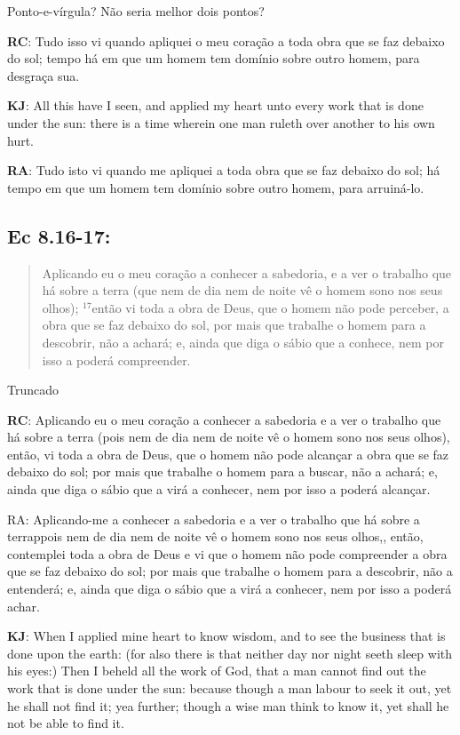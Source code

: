 Ponto-e-vírgula? Não seria melhor dois pontos?

\textbf{RC}: Tudo isso vi quando apliquei o meu coração a toda obra que se faz debaixo do sol; tempo há em que um homem tem domínio sobre outro homem, para desgraça sua.

\textbf{KJ}: All this have I seen, and applied my heart unto every work that is done under the sun: there is a time wherein one man ruleth over another to his own hurt.

\textbf{RA}: Tudo isto vi quando me apliquei a toda obra que se faz debaixo do sol; há tempo em que um homem tem domínio sobre outro homem, para arruiná-lo.

\subsection*{Ec 8.16-17:} 
 \begin{quote} 
 Aplicando eu o meu coração a conhecer a sabedoria, e a ver o trabalho que há sobre a terra (que nem de dia nem de noite vê o homem sono nos seus olhos); $^{\mathrm{17}}$então vi toda a obra de Deus, que o homem não pode perceber, a obra que se faz debaixo do sol, por mais que trabalhe o homem para a descobrir, não a achará; e, ainda que diga o sábio que a conhece, nem por isso a poderá compreender.
 \end{quote}

Truncado

\textbf{RC}: Aplicando eu o meu coração a conhecer a sabedoria e a ver o trabalho que há sobre a terra (pois nem de dia nem de noite vê o homem sono nos seus olhos), então, vi toda a obra de Deus, que o homem não pode alcançar a obra que se faz debaixo do sol; por mais que trabalhe o homem para a buscar, não a achará; e, ainda que diga o sábio que a virá a conhecer, nem por isso a poderá alcançar.

RA: Aplicando-me a conhecer a sabedoria e a ver o trabalho que há sobre a terrappois nem de dia nem de noite vê o homem sono nos seus olhos,, então, contemplei toda a obra de Deus e vi que o homem não pode compreender a obra que se faz debaixo do sol; por mais que trabalhe o homem para a descobrir, não a entenderá; e, ainda que diga o sábio que a virá a conhecer, nem por isso a poderá achar.

\textbf{KJ}: When I applied mine heart to know wisdom, and to see the business that is done upon the earth: (for also there is that neither day nor night seeth sleep with his eyes:) Then I beheld all the work of God, that a man cannot find out the work that is done under the sun: because though a man labour to seek it out, yet he shall not find it; yea further; though a wise man think to know it, yet shall he not be able to find it.

